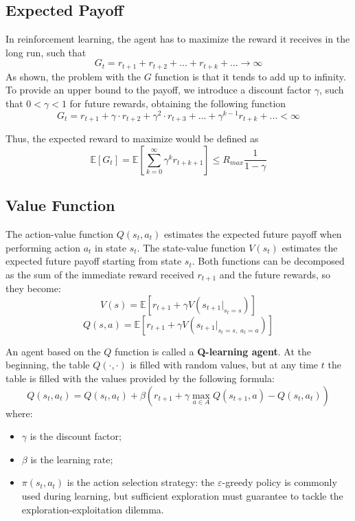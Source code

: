 \documentclass{article}
\begin{document}
\subsection{Expected Payoff}
In reinforcement learning, the agent has to maximize the reward it receives in the long run, such that
\[G_t = r_{t+1} + r_{t+2} + ... + r_{t+k} + ... \to \infty\]
As shown, the problem with the \(G\) function is that it tends to add up to infinity. To provide an upper bound to the payoff, we introduce a discount factor \(\gamma\), such that \(0 < \gamma < 1\) for future rewards, obtaining the following function
\[G_t = r_{t+1} + \gamma \cdot r_{t+2} + \gamma^2 \cdot r_{t+3} + ... + \gamma^{k-1} r_{t+k} + ... < \infty \]

Thus, the expected reward to maximize would be defined as
\[\mathbb{E}[G_t] = \mathbb{E}\left[\sum_{k=0}^{\infty}\gamma^k r_{t+k+1}\right] \le R_{max}\frac{1}{1-\gamma}\]

\subsection{Value Function}
The action-value function \(Q(s_t, a_t)\) estimates the expected future payoff when performing action \(a_t\) in state \(s_t\). The state-value function \(V(s_t)\) estimates the expected future payoff starting from state \(s_t\). Both functions can be decomposed as the sum of the immediate reward received \(r_{t+1}\) and the future rewards, so they become:
\[V(s) = \mathbb{E}[r_{t+1}+\gamma V(s_{t+1}|_{s_t=s})]\]
\[Q(s,a) = \mathbb{E}[r_{t+1}+\gamma  V(s_{t+1}|_{s_t =s,\; a_t = a})]\]

An agent based on the \(Q\) function is called a \textbf{Q-learning agent}. At the beginning, the table \(Q(\cdot, \cdot)\) is filled with random values, but at any time \(t\) the table is filled with the values provided by the following formula:
\[Q(s_t, a_t) = Q(s_t, a_t) + \beta(r_{t+1} + \gamma  \max_{a\in A}Q(s_{t+1}, a) - Q(s_t, a_t)) \]
where:
\begin{itemize}
    \item \(\gamma\) is the discount factor;
    \item \(\beta\) is the learning rate;
    \item \(\pi(s_t, a_t)\) is the action selection strategy: the \(\varepsilon\)-greedy policy is commonly used during learning, but sufficient exploration must guarantee to tackle the exploration-exploitation dilemma.
\end{itemize}
\end{document}
